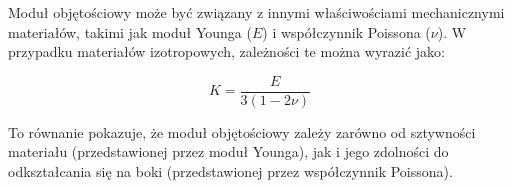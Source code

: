 \hspace{1.5cm} Moduł objętościowy może być związany z innymi właściwościami mechanicznymi materiałów, takimi jak moduł Younga ($E$) i współczynnik Poissona ($\nu$). W przypadku materiałów izotropowych, zależności te można wyrazić jako:

$$
K = \frac{E}{3(1 - 2\nu)}
$$

\hspace{1.5cm} To równanie pokazuje, że moduł objętościowy zależy zarówno od sztywności materiału (przedstawionej przez moduł Younga), jak i jego zdolności do odkształcania się na boki (przedstawionej przez współczynnik Poissona).

\clearpage